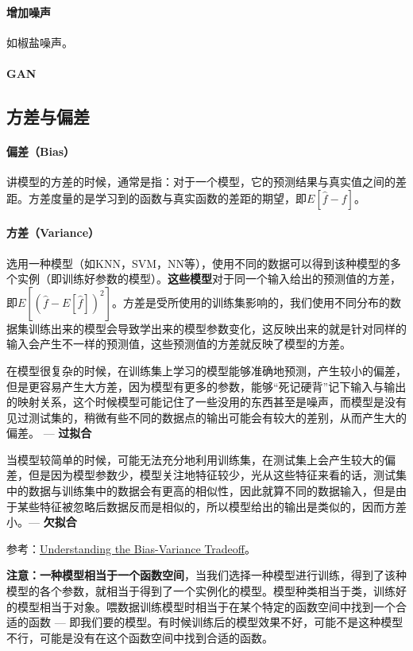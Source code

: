 \paragraph{增加噪声}
如椒盐噪声。

\paragraph{GAN}


\subsection{方差与偏差}
\paragraph{偏差（Bias）}讲模型的方差的时候，通常是指：对于一个模型，它的预测结果与真实值之间的差距。方差度量的是学习到的函数与真实函数的差距的期望，即$E[\hat{f} - f]$。

\paragraph{方差（Variance）}选用一种模型（如KNN，SVM，NN等），使用不同的数据可以得到该种模型的多个实例（即训练好参数的模型）。\textbf{这些模型}对于同一个输入给出的预测值的方差，即$E[(\hat{f} - E[\hat{f}])^2]$。方差是受所使用的训练集影响的，我们使用不同分布的数据集训练出来的模型会导致学出来的模型参数变化，这反映出来的就是针对同样的输入会产生不一样的预测值，这些预测值的方差就反映了模型的方差。

在模型很复杂的时候，在训练集上学习的模型能够准确地预测，产生较小的偏差，但是更容易产生大方差，因为模型有更多的参数，能够“死记硬背”记下输入与输出的映射关系，这个时候模型可能记住了一些没用的东西甚至是噪声，而模型是没有见过测试集的，稍微有些不同的数据点的输出可能会有较大的差别，从而产生大的偏差。 --- \textbf{过拟合}

当模型较简单的时候，可能无法充分地利用训练集，在测试集上会产生较大的偏差，但是因为模型参数少，模型关注地特征较少，光从这些特征来看的话，测试集中的数据与训练集中的数据会有更高的相似性，因此就算不同的数据输入，但是由于某些特征被忽略后数据反而是相似的，所以模型给出的输出是类似的，因而方差小。--- \textbf{欠拟合}

参考：\href{http://scott.fortmann-roe.com/docs/BiasVariance.html}{Understanding the Bias-Variance Tradeoff}。


\textbf{注意：}\textbf{一种模型相当于一个函数空间}，当我们选择一种模型进行训练，得到了该种模型的各个参数，就相当于得到了一个实例化的模型。模型种类相当于类，训练好的模型相当于对象。喂数据训练模型时相当于在某个特定的函数空间中找到一个合适的函数 --- 即我们要的模型。有时候训练后的模型效果不好，可能不是这种模型不行，可能是没有在这个函数空间中找到合适的函数。

